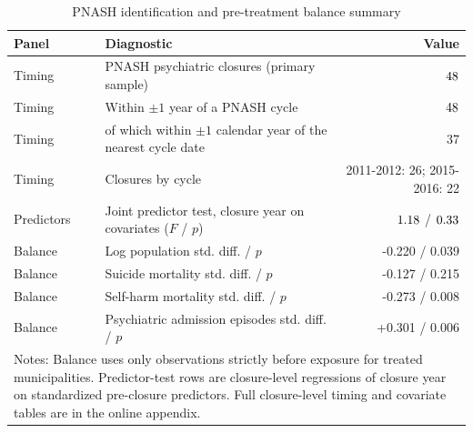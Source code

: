 \begin{table}[!htbp]\centering
\caption{PNASH identification and pre-treatment balance summary}
\label{tab:pnash-identification-summary}
\small
\begin{tabular}{llr}
\toprule
Panel & Diagnostic & Value \\
\midrule
Timing & PNASH psychiatric closures (primary sample) & $48$ \\
Timing & Within $\pm 1$ year of a PNASH cycle & $48$ \\
Timing & \quad of which within $\pm 1$ calendar year of the nearest cycle date & 37 \\
Timing & Closures by cycle & 2011-2012: 26; 2015-2016: 22 \\
Predictors & Joint predictor test, closure year on covariates ($F$ / $p$) & $1.18$ / $0.33$ \\
\midrule
Balance & Log population std. diff. / $p$ & -0.220 / 0.039 \\
Balance & Suicide mortality std. diff. / $p$ & -0.127 / 0.215 \\
Balance & Self-harm mortality std. diff. / $p$ & -0.273 / 0.008 \\
Balance & Psychiatric admission episodes std. diff. / $p$ & +0.301 / 0.006 \\
\bottomrule
\multicolumn{3}{p{0.78\textwidth}}{\footnotesize Notes: Balance uses only observations strictly before exposure for treated municipalities. Predictor-test rows are closure-level regressions of closure year on standardized pre-closure predictors. Full closure-level timing and covariate tables are in the online appendix.}\\
\end{tabular}
\end{table}

